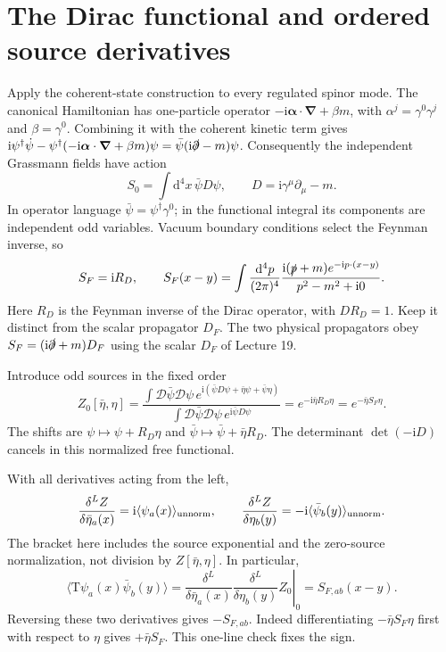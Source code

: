\documentclass[11pt]{article}
\newcommand{\dd}{\mathrm d}
\newcommand{\ii}{\mathrm i}
\newcommand{\D}{\mathcal D}
\newcommand{\Tord}{\mathrm T}
\newcommand{\module}[1]{\clearpage\section{#1}}
\begin{document}
\module{The Dirac functional and ordered source derivatives}
Apply the coherent-state construction to every regulated spinor mode.
The canonical Hamiltonian has one-particle operator
\(-\ii\bm\alpha\cdot\bm\nabla+\beta m\), with
\(\alpha^j=\gamma^0\gamma^j\) and \(\beta=\gamma^0\).
Combining it with the coherent kinetic term gives
\(\ii\psi^\dagger\dot\psi-
\psi^\dagger(-\ii\bm\alpha\cdot\bm\nabla+\beta m)\psi
=\bar\psi(\ii\slashed\partial-m)\psi\).
Consequently the independent Grassmann fields have action
\begin{equation}
 S_0=\int\dd^4x\,\bar\psi D\psi,\qquad
 D=\ii\gamma^\mu\partial_\mu-m.
\end{equation}
In operator language \(\bar\psi=\psi^\dagger\gamma^0\); in the
functional integral its components are independent odd variables.
Vacuum boundary conditions select the Feynman inverse, so
\begin{equation}
 S_F=\ii R_D,\qquad
 S_F(x-y)=\int\frac{\dd^4p}{(2\pi)^4}
 \frac{\ii(\slashed p+m)e^{-\ii p\cdot(x-y)}}{p^2-m^2+\ii0}.
                                                        \label{eq:SF}
\end{equation}
Here \(R_D\) is the Feynman inverse of the Dirac operator,
with \(DR_D=1\). Keep it distinct from the scalar propagator
\(D_F\). The two physical propagators obey
\(S_F=(\ii\slashed\partial+m)D_F\) using the scalar \(D_F\) of Lecture 19.

Introduce odd sources in the fixed order
\begin{equation}
 Z_0[\bar\eta,\eta]=
 \frac{\int\D\bar\psi\D\psi\,
 e^{\ii(\bar\psi D\psi+\bar\eta\psi+\bar\psi\eta)}}
 {\int\D\bar\psi\D\psi\,e^{\ii\bar\psi D\psi}}
 =e^{-\ii\bar\eta R_D\eta}=e^{-\bar\eta S_F\eta}.     \label{eq:fermZ}
\end{equation}
The shifts are \(\psi\mapsto\psi+R_D\eta\) and
\(\bar\psi\mapsto\bar\psi+\bar\eta R_D\). The determinant
\(\det(-\ii D)\) cancels in this normalized free functional.

With all derivatives acting from the left,
\begin{equation}
 \frac{\delta^L Z}{\delta\bar\eta_a(x)}
 =\ii\langle\psi_a(x)\rangle_{\rm unnorm},\qquad
 \frac{\delta^L Z}{\delta\eta_b(y)}
 =-\ii\langle\bar\psi_b(y)\rangle_{\rm unnorm}.
\end{equation}
The bracket here includes the source exponential and the zero-source
normalization, not division by \(Z[\bar\eta,\eta]\). In particular,
\begin{equation}
 \langle\Tord\psi_a(x)\bar\psi_b(y)\rangle
 =\left.\frac{\delta^L}{\delta\bar\eta_a(x)}
           \frac{\delta^L}{\delta\eta_b(y)}Z_0\right|_0
 =S_{F,ab}(x-y).                                     \label{eq:derivatives}
\end{equation}
Reversing these two derivatives gives \(-S_{F,ab}\).
Indeed differentiating \(-\bar\eta S_F\eta\) first with respect to
\(\eta\) gives \(+\bar\eta S_F\). This one-line check fixes the sign.
\end{document}
